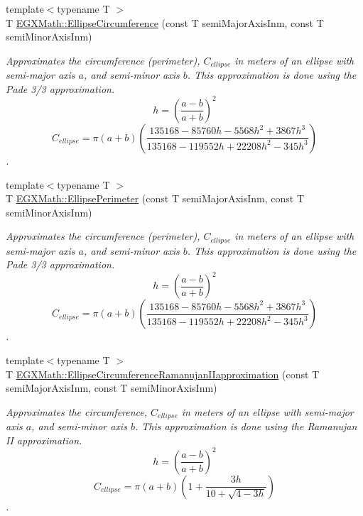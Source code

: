 \begin{DoxyCompactItemize}
\item 
{\footnotesize template$<$typename T $>$ }\\T \mbox{\hyperlink{group___e_g_x_math-_geometry-2_d-_ellipse-_circumference_ga4172802ac674eb53467b44928ac635c7}{E\+G\+X\+Math\+::\+Ellipse\+Circumference}} (const T semi\+Major\+Axis\+Inm, const T semi\+Minor\+Axis\+Inm)
\begin{DoxyCompactList}\small\item\em Approximates the circumference (perimeter), $C_{ellipse}$ in meters of an ellipse with semi-\/major axis $a$, and semi-\/minor axis $b$. This approximation is done using the Pade 3/3 approximation. \[ h=\left( \frac{a-b}{a+b} \right)^2 \] \[ C_{ellipse}=\pi (a + b) \left( \frac{135168-85760 h-5568 h^2+ 3867 h^3}{135168-119552 h+ 22208 h^2 - 345h^3} \right) \]. \end{DoxyCompactList}\item 
{\footnotesize template$<$typename T $>$ }\\T \mbox{\hyperlink{group___e_g_x_math-_geometry-2_d-_ellipse-_circumference_ga2d4ee70e08d6fb4b56209ad4fc3f38ca}{E\+G\+X\+Math\+::\+Ellipse\+Perimeter}} (const T semi\+Major\+Axis\+Inm, const T semi\+Minor\+Axis\+Inm)
\begin{DoxyCompactList}\small\item\em Approximates the circumference (perimeter), $C_{ellipse}$ in meters of an ellipse with semi-\/major axis $a$, and semi-\/minor axis $b$. This approximation is done using the Pade 3/3 approximation. \[ h=\left( \frac{a-b}{a+b} \right)^2 \] \[ C_{ellipse}=\pi (a + b) \left( \frac{135168-85760 h-5568 h^2+ 3867 h^3}{135168-119552 h+ 22208 h^2 - 345h^3} \right) \]. \end{DoxyCompactList}\item 
{\footnotesize template$<$typename T $>$ }\\T \mbox{\hyperlink{group___e_g_x_math-_geometry-2_d-_ellipse-_circumference_gaa908406db81fadc7c2d73e4e113d24d7}{E\+G\+X\+Math\+::\+Ellipse\+Circumference\+Ramanujan\+I\+Iapproximation}} (const T semi\+Major\+Axis\+Inm, const T semi\+Minor\+Axis\+Inm)
\begin{DoxyCompactList}\small\item\em Approximates the circumference, $C_{ellipse}$ in meters of an ellipse with semi-\/major axis $a$, and semi-\/minor axis $b$. This approximation is done using the Ramanujan II approximation. \[ h=\left( \frac{a-b}{a+b} \right)^2 \] \[ C_{ellipse}=\pi (a + b) \left( 1+\frac{3h}{10+\sqrt{4-3h}} \right) \]. \end{DoxyCompactList}\item 

\end{DoxyCompactItemize}

